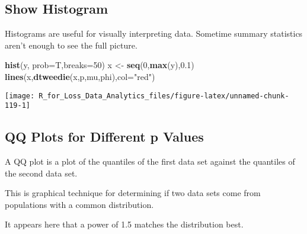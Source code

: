 \documentclass[]{book}
\newenvironment{Shaded}{\begin{snugshade}}{\end{snugshade}}
\newcommand{\KeywordTok}[1]{\textcolor[rgb]{0.13,0.29,0.53}{\textbf{#1}}}
\newcommand{\DataTypeTok}[1]{\textcolor[rgb]{0.13,0.29,0.53}{#1}}
\newcommand{\DecValTok}[1]{\textcolor[rgb]{0.00,0.00,0.81}{#1}}
\newcommand{\FloatTok}[1]{\textcolor[rgb]{0.00,0.00,0.81}{#1}}
\newcommand{\StringTok}[1]{\textcolor[rgb]{0.31,0.60,0.02}{#1}}
\newcommand{\NormalTok}[1]{#1}
\theoremstyle{definition}
\theoremstyle{definition}
\theoremstyle{definition}
\theoremstyle{remark}
\begin{document}
\subsection{Show Histogram}\label{show-histogram}

Histograms are useful for visually interpreting data. Sometime summary
statistics aren't enough to see the full picture.

\begin{Shaded}
\begin{Highlighting}[]
\KeywordTok{hist}\NormalTok{(y, }\DataTypeTok{prob=}\NormalTok{T,}\DataTypeTok{breaks=}\DecValTok{50}\NormalTok{)}
\NormalTok{x <-}\StringTok{ }\KeywordTok{seq}\NormalTok{(}\DecValTok{0}\NormalTok{,}\KeywordTok{max}\NormalTok{(y),}\FloatTok{0.1}\NormalTok{)}
\KeywordTok{lines}\NormalTok{(x,}\KeywordTok{dtweedie}\NormalTok{(x,p,mu,phi),}\DataTypeTok{col=}\StringTok{"red"}\NormalTok{)}
\end{Highlighting}
\end{Shaded}

\begin{center}\texttt{[image: R\_for\_Loss\_Data\_Analytics\_files/figure-latex/unnamed-chunk-119-1]} \end{center}

\subsection{QQ Plots for Different p
Values}\label{qq-plots-for-different-p-values}

A QQ plot is a plot of the quantiles of the first data set against the
quantiles of the second data set.

This is graphical technique for determining if two data sets come from
populations with a common distribution.

It appears here that a power of 1.5 matches the distribution best.
\end{document}
